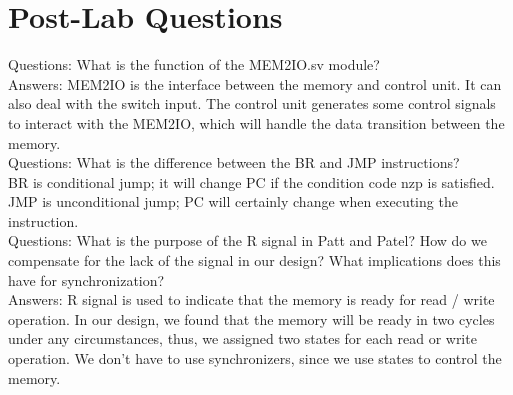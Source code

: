 \documentclass[12pt]{article}
\begin{document}
\section{Post-Lab Questions}
\begin{table}[H]
    \centering
    \caption{Design statistics table for the multiplier.}
\end{table}

Questions: What is the function of the MEM2IO.sv module? \\

Answers: MEM2IO is the interface between the memory and control unit. It can also deal with the switch input. The control unit generates some control signals to interact with the MEM2IO, which will handle the data transition between the memory. \\

Questions: What is the difference between the BR and JMP instructions? \\

BR is conditional jump; it will change PC if the condition code nzp is satisfied. JMP is unconditional jump; PC will certainly change when executing the instruction. \\

Questions: What is the purpose of the R signal in Patt and Patel? How do we compensate for the lack of the signal in our design? What implications does this have for synchronization? \\

Answers: R signal is used to indicate that the memory is ready for read / write operation. In our design, we found that the memory will be ready in two cycles under any circumstances, thus, we assigned two states for each read or write operation. We don’t have to use synchronizers, since we use states to control the memory.
\end{document}
